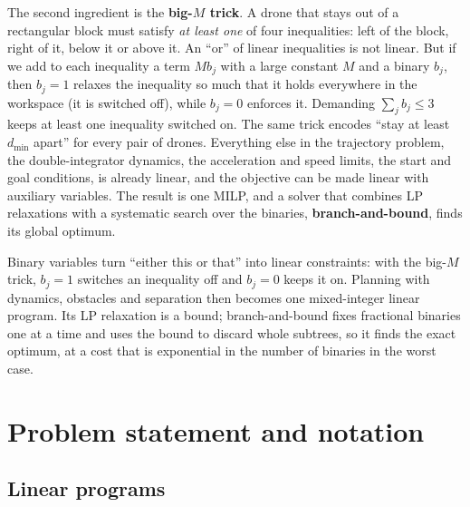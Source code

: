 The second ingredient is the \textbf{big-$M$ trick}. A drone that stays out of a rectangular block must satisfy
\emph{at least one} of four inequalities: left of the block, right of it,
below it or above it. An ``or'' of linear inequalities is not linear. But if
we add to each inequality a term $M b_j$ with a large constant $M$ and a
binary $b_j$, then $b_j = 1$ relaxes the inequality so much that it holds
everywhere in the workspace (it is switched off), while $b_j = 0$ enforces it.
Demanding $\sum_j b_j \le 3$ keeps at least one inequality switched on.
The same trick encodes ``stay at least $d_{\min}$ apart'' for every pair of
drones. Everything else in the trajectory problem, the double-integrator
dynamics, the acceleration and speed limits, the start and goal conditions,
is already linear, and the objective can be made linear with auxiliary
variables. The result is one MILP, and a solver that combines LP relaxations
with a systematic search over the binaries, \textbf{branch-and-bound}, finds
its global optimum.

\begin{keyidea}
Binary variables turn ``either this or that'' into linear constraints: with
the big-$M$ trick, $b_j = 1$ switches an inequality off and $b_j = 0$ keeps
it on. Planning with dynamics, obstacles and separation then becomes one
mixed-integer linear program. Its LP relaxation is a bound; branch-and-bound
fixes fractional binaries one at a time and uses the bound to discard whole
subtrees, so it finds the exact optimum, at a cost that is exponential in the
number of binaries in the worst case.
\end{keyidea}

\section{Problem statement and notation}
\label{sec:ch22-problem}

\subsection{Linear programs}
\label{sec:ch22-lp}

